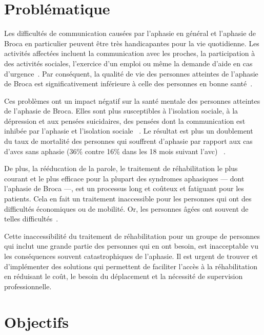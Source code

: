 \section*{Problématique}

Les difficultés de communication causées par l'aphasie en général 
et l'aphasie de Broca en particulier peuvent être très handicapantes pour la vie quotidienne.
Les activités affectées incluent la communication avec les proches, la participation à des activités sociales,
l'exercice d'un emploi ou même la demande d'aide en cas d'urgence~\cite{Hallowell_2017}.
Par conséquent, la qualité de vie des personnes atteintes de l'aphasie de Broca 
est significativement inférieure à celle des personnes en bonne santé~\cite{Pallavi_Perumal_Krupa_2018,Ross_Wertz_2010}.

Ces problèmes ont un impact négatif sur la santé mentale des personnes atteintes de l'aphasie de Broca.
Elles sont plus susceptibles à l'isolation sociale, à la dépression et aux pensées suicidaires,
des pensées dont la communication est inhibée par l'aphasie et l'isolation sociale%
~\cite{Costanza_et_al._2021,Morrison_2016}.
Le résultat est plus un doublement du taux de mortalité des personnes qui souffrent d'aphasie
par rapport aux cas d'\glspl{avc} sans aphasie (36\% contre 16\% dans les 18 mois suivant l'\gls{avc})%
~\cite{Laska_Hellblom_Murray_Kahan_Von_Arbin_2001}.

De plus, la rééducation de la parole, le traitement de réhabilitation le plus courant et le plus efficace 
pour la plupart des syndromes aphasiques --- dont l'aphasie de Broca ---,
est un processus long et coûteux et fatiguant pour les patients.
Cela en fait un traitement inaccessible pour les personnes qui ont des difficultés économiques ou de mobilité.
Or, les personnes âgées ont souvent de telles difficultés~\cite{Jacobs_Ellis_2021,Liu_Huang_Xu_Wu_Tao_Chen_2021}.

Cette inaccessibilité du traitement de réhabilitation pour un groupe de personnes 
qui inclut une grande partie des personnes qui en ont besoin, 
est inacceptable vu les conséquences souvent catastrophiques de l'aphasie.
Il est urgent de trouver et d'implémenter des solutions qui permettent de faciliter l'accès à la réhabilitation
en réduisant le coût, le besoin du déplacement et la nécessité de supervision professionnelle.

\section*{Objectifs}

